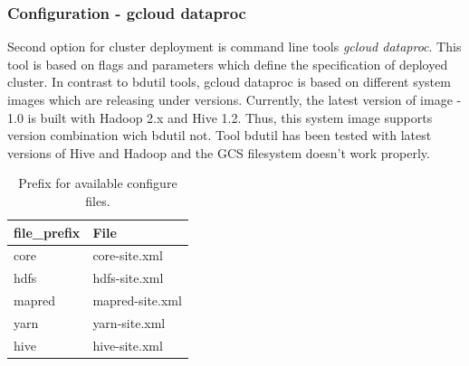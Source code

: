 \documentclass[a4paper,12pt,oneside]{report}
\begin{document}
	\subsubsection{Configuration - gcloud dataproc}
    Second option for cluster deployment is command line tools \textit{gcloud
    	dataproc}. This tool is based on flags and parameters which define the specification
    of deployed cluster. In contrast to bdutil tools, gcloud dataproc is based on
    different system images which are releasing under versions. Currently, the latest
    version of image - 1.0 is built with Hadoop 2.x and Hive 1.2. Thus, this system image 
    supports version combination wich bdutil not. Tool bdutil has been tested with latest 
    versions of Hive and Hadoop and the GCS filesystem doesn’t work properly.  
	\begin{table}[!htbp]
		\centering
		\begin{scriptsize}
			\begin{tabular}{@{}|l|l|@{}}
				\toprule 
				file\_prefix & File            \\ \midrule \midrule
				core         & core-site.xml   \\ \midrule
				hdfs         & hdfs-site.xml   \\ \midrule
				mapred       & mapred-site.xml \\ \midrule
				yarn         & yarn-site.xml   \\ \midrule
				hive         & hive-site.xml   \\ \bottomrule
			\end{tabular}
		\end{scriptsize}
		\caption{Prefix for available configure files.}
		\label{config_table}
	\end{table}
\end{document}

